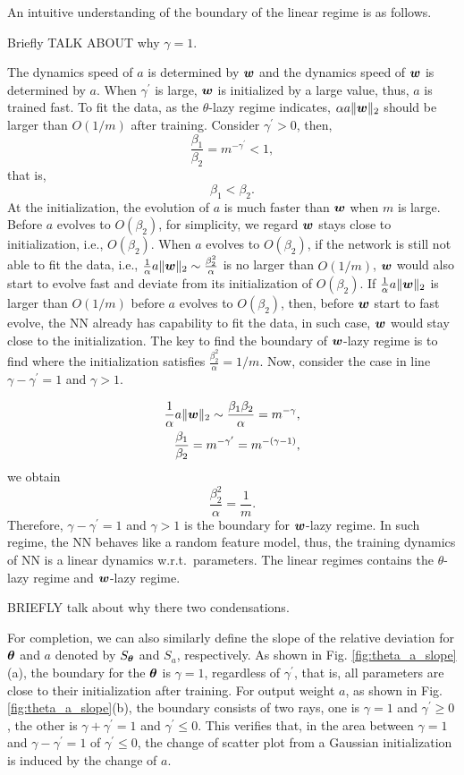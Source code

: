 \documentclass{article}
\begin{document}
An intuitive understanding of  the boundary of the linear regime is as follows.

Briefly TALK ABOUT why  $\gamma=1$.

The dynamics speed of $a$ is determined by $\bm{w}$ and the dynamics speed of $\bm{w}$ is determined by $a$. When $\gamma^{\prime}$ is large, $\bm{w}$ is initialized by a large value, thus, $a$ is trained fast. To fit the data, as the $\theta$-lazy regime indicates, $\alpha a \lVert\bm{w}\rVert_{2}$ should be larger than $O(1/m)$ after training. Consider $\gamma^{\prime}>0$, then,
\[
    \frac{\beta_1}{\beta_2}=m^{-\gamma^{\prime}}<1,
\]
that is,
\[
    \beta_1<\beta_2.
\]
At the initialization, the evolution of $a$ is much faster than $\bm{w}$ when $m$ is large. Before $a$ evolves to $O(\beta_2)$, for simplicity, we regard $\bm{w}$ stays close to initialization, i.e., $O(\beta_2)$. When $a$ evolves to $O(\beta_2)$, if the network is still not able to fit the data, i.e., $\frac{1}{\alpha} a \lVert\bm{w}\rVert_{2}\sim \frac{\beta_{2}^{2}}{\alpha} $ is no larger than $O(1/m)$, $\bm{w}$ would also start to evolve fast and deviate from its initialization of $O(\beta_2)$. If  $\frac{1}{\alpha} a \lVert\bm{w}\rVert_{2}$ is   larger than $O(1/m)$ before $a$ evolves to $O(\beta_2)$, then, before $\bm{w}$ start to fast evolve, the NN already has capability to fit the data, in such case, $\bm{w}$ would stay close to the initialization. The key to find the boundary of $\bm{w}$-lazy regime is to find where the initialization satisfies $\frac{\beta_{2}^{2}}{\alpha}=1/m$.  Now, consider the case in line $\gamma-\gamma^{\prime}=1$ and $\gamma>1$.

\begin{align}
    \frac{1}{\alpha} a \lVert\bm{w}\rVert_{2}\sim \frac{\beta_1 \beta_2}{\alpha}=m^{-\gamma}, \\
    \frac{\beta_1}{\beta_2}=m^{-\gamma^{\prime}}=m^{-(\gamma-1)},
\end{align}
we obtain
\[
    \frac{\beta_{2}^{2}}{\alpha} =\frac{1}{m}.
\]
Therefore, $\gamma-\gamma^{\prime}=1$ and $\gamma>1$ is the boundary for $\bm{w}$-lazy regime. In such regime, the NN behaves like a random feature model, thus, the training dynamics of NN is a linear dynamics w.r.t.\ parameters. The linear regimes contains the $\theta$-lazy regime and $\bm{w}$-lazy regime.


BRIEFLY talk about why there two condensations.

For completion, we can also similarly define the slope of the relative deviation for $\bm{\theta}$ and $a$ denoted by $S_{\bm{\theta}}$ and $S_{a}$, respectively. As shown in
Fig. \ref{fig:theta_a_slope} (a), the boundary for the $\bm{\theta}$ is $\gamma=1$, regardless of $\gamma^{\prime}$, that is, all parameters are close to their initialization after training. For output weight $a$, as shown in Fig. \ref{fig:theta_a_slope}(b), the boundary consists of two rays, one is  $\gamma=1$ and
$\gamma^{\prime}\geq 0$, the other is $\gamma+\gamma^{\prime}=1$ and $\gamma^{\prime}\leq 0$. This verifies that, in the area between  $\gamma=1$ and $\gamma-\gamma^{\prime}=1$ of  $\gamma^{\prime}\leq 0$, the change of scatter plot from a Gaussian initialization is induced by the change of $a$.
\end{document}
